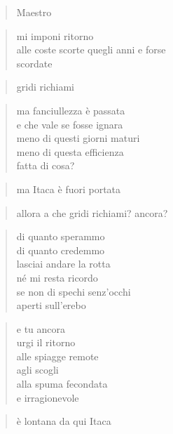 
\vspace*{2cm}

	\begin{verse}
		Maestro
	\end{verse}

	\begin{verse}
		mi imponi ritorno\\
		alle coste scorte quegli anni e forse\\
		scordate
	\end{verse}

	\begin{verse}
		gridi richiami
	\end{verse}

	\begin{verse}
		ma fanciullezza è passata\\
		e che vale se fosse ignara\\
		meno di questi giorni maturi\\
		meno di questa efficienza\\
		fatta di cosa?
	\end{verse}

	\begin{verse}
		ma Itaca è fuori portata
	\end{verse}

	\begin{verse}
		allora a che gridi richiami? ancora?
	\end{verse}

	\begin{verse}
		di quanto sperammo\\
		di quanto credemmo\\
		lasciai andare la rotta\\
		né mi resta ricordo\\
		se non di spechi senz’occhi\\
		aperti sull’erebo
	\end{verse}

	\begin{verse}
		e tu ancora\\
		urgi il ritorno\\
		alle spiagge remote\\
		agli scogli\\
		alla spuma fecondata\\
		e irragionevole
	\end{verse}

	\begin{verse}
		è lontana da qui Itaca
	\end{verse}

